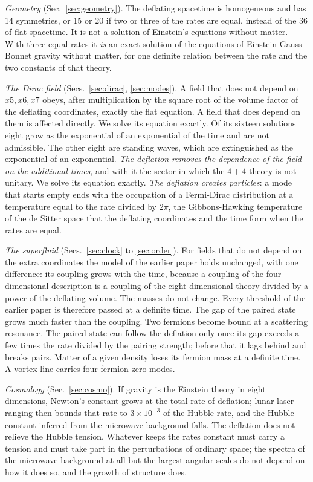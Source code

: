 \emph{Geometry} (Sec.~\ref{sec:geometry}). The deflating spacetime is homogeneous and has 14
symmetries, or 15 or 20 if two or three of the rates are equal, instead of the 36 of flat spacetime.
It is not a solution of Einstein's equations without matter. With three equal rates it \emph{is} an
exact solution of the equations of Einstein-Gauss-Bonnet gravity without matter, for one definite
relation between the rate and the two constants of that theory.

\emph{The Dirac field} (Secs.~\ref{sec:dirac}, \ref{sec:modes}). A field that does not depend on
$x5,x6,x7$ obeys, after multiplication by the square root of the volume factor of the deflating
coordinates, exactly the flat equation. A field that does depend on them is affected directly.
We solve its equation exactly. Of its sixteen solutions eight grow as the exponential of an
exponential of the time and are not admissible. The other eight are standing waves, which are
extinguished as the exponential of an exponential. \emph{The deflation removes the dependence of the
field on the additional times}, and with it the sector in which the $4+4$ theory is not unitary.
We solve its equation exactly. \emph{The deflation creates particles}: a mode that starts empty ends
with the occupation of a Fermi-Dirac distribution at a temperature equal to the rate divided by
$2\pi$, the Gibbons-Hawking temperature of the de Sitter space that the deflating coordinates and the
time form when the rates are equal.

\emph{The superfluid} (Secs.~\ref{sec:clock} to \ref{sec:order}). For fields that do not depend on
the extra coordinates the model of the earlier paper holds unchanged, with one difference: its
coupling grows with the time, because a coupling of the four-dimensional description is a coupling
of the eight-dimensional theory divided by a power of the deflating volume. The masses do not change.
Every threshold of the earlier paper is therefore passed at a definite time. The gap of the paired
state grows much faster than the coupling. Two fermions become bound at a scattering resonance. The
paired state can follow the deflation only once its gap exceeds a few times the rate divided by the
pairing strength; before that it lags behind and breaks pairs. Matter of a given density loses its
fermion mass at a definite time. A vortex line carries four fermion zero modes.

\emph{Cosmology} (Sec.~\ref{sec:cosmo}). If gravity is the Einstein theory in eight dimensions,
Newton's constant grows at the total rate of deflation; lunar laser ranging then bounds that rate to
$3\times10^{-3}$ of the Hubble rate, and the Hubble constant inferred from the microwave background
falls. The deflation does not relieve the Hubble tension. Whatever keeps the rates constant must
carry a tension and must take part in the perturbations of ordinary space; the spectra of the
microwave background at all but the largest angular scales do not depend on how it does so, and
the growth of structure does.

